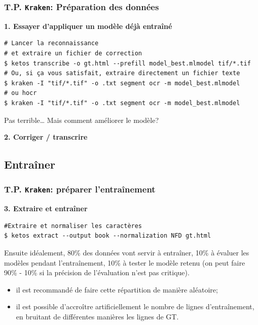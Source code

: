 \documentclass[10pt, compress,urlcolor=blue]{beamer}
\begin{document}
\begin{frame}[fragile]
\frametitle{T.P. \texttt{Kraken}: Préparation des données}

\textbf{1. Essayer d'appliquer un modèle déjà entraîné}
\begin{verbatim}
# Lancer la reconnaissance 
# et extraire un fichier de correction
$ ketos transcribe -o gt.html --prefill model_best.mlmodel tif/*.tif
# Ou, si ça vous satisfait, extraire directement un fichier texte
$ kraken -I "tif/*.tif" -o .txt segment ocr -m model_best.mlmodel
# ou hocr
$ kraken -I "tif/*.tif" -o .txt segment ocr -m model_best.mlmodel
\end{verbatim}

Pas terrible… Mais comment améliorer le modèle?

\textbf{2. Corriger / transcrire}
\end{frame}

\subsection{Entraîner}

\begin{frame}[fragile]
\frametitle{T.P. \texttt{Kraken}: préparer l'entraînement}


\textbf{3. Extraire et entraîner}
\begin{verbatim}
#Extraire et normaliser les caractères
$ ketos extract --output book --normalization NFD gt.html
\end{verbatim}

Ensuite idéalement, 80\% des données vont servir à entraîner, 10\% à évaluer les modèles pendant l'entraînement, 10\% à tester le modèle retenu (on peut faire 90\% - 10\% si la précision de l'évaluation n'est pas critique).

\begin{itemize}
    \item \alert{il est recommandé de faire cette répartition de manière aléatoire};
    \item \alert{il est possible d'accroître artificiellement le nombre de lignes d'entraînement, en bruitant de différentes manières les lignes de GT.}
\end{itemize}
\end{frame}
\end{document}
